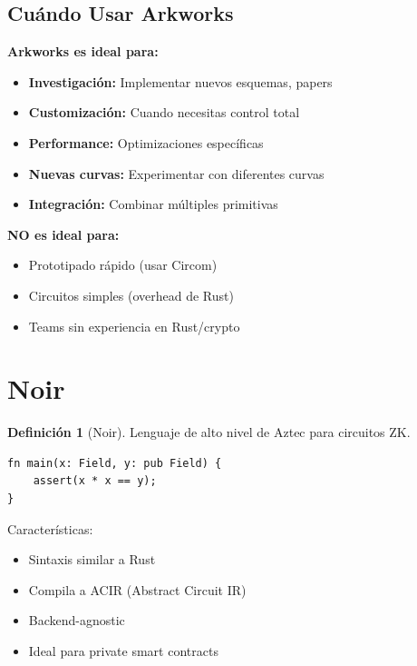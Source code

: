 \documentclass[11pt,a4paper,twoside,openright]{book}
\theoremstyle{definition}
\newtheorem{definition}{Definición}[chapter]
\theoremstyle{plain}
\theoremstyle{remark}
\begin{document}
\subsection{Cuándo Usar Arkworks}

\begin{keyidea}
\textbf{Arkworks es ideal para:}

\begin{itemize}
    \item \textbf{Investigación:} Implementar nuevos esquemas, papers
    \item \textbf{Customización:} Cuando necesitas control total
    \item \textbf{Performance:} Optimizaciones específicas
    \item \textbf{Nuevas curvas:} Experimentar con diferentes curvas
    \item \textbf{Integración:} Combinar múltiples primitivas
\end{itemize}

\textbf{NO es ideal para:}

\begin{itemize}
    \item Prototipado rápido (usar Circom)
    \item Circuitos simples (overhead de Rust)
    \item Teams sin experiencia en Rust/crypto
\end{itemize}
\end{keyidea}

\section{Noir}

\begin{definition}[Noir]
Lenguaje de alto nivel de Aztec para circuitos ZK.
\end{definition}

\begin{verbatim}
fn main(x: Field, y: pub Field) {
    assert(x * x == y);
}
\end{verbatim}

Características:
\begin{itemize}
    \item Sintaxis similar a Rust
    \item Compila a ACIR (Abstract Circuit IR)
    \item Backend-agnostic
    \item Ideal para private smart contracts
\end{itemize}
\end{document}
